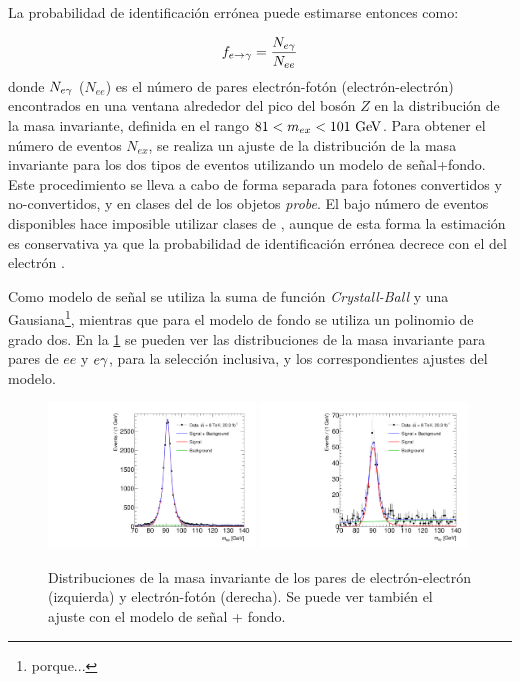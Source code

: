 La probabilidad de identificación errónea {\feg} puede estimarse entonces como:

\begin{equation}\label{eq:efakerate}
  f_{e\rightarrow\gamma} = \frac{N_{e\gamma}}{N_{ee}}
\end{equation}
%
donde $N_{e\gamma}$ ($N_{ee}$) es el número de pares electrón-fotón
(electrón-electrón) encontrados en una ventana alrededor del pico del bosón $Z$ en la distribución de
la masa invariante, definida en el rango $81 < m_{ex} < 101 \gev$. Para obtener
el número de eventos $N_{ex}$, se realiza un ajuste de la distribución de la
masa invariante para los dos tipos de eventos utilizando un modelo de
señal+fondo. Este procedimiento se lleva a cabo de forma separada para fotones
convertidos y no-convertidos, y en clases del {\abseta} de los objetos
\emph{probe}. El bajo número de eventos disponibles hace imposible utilizar
clases de {\pt}, aunque de esta forma la estimación es conservativa ya que la
probabilidad de identificación errónea decrece con el {\pt} del electrón
\cite{Kuhl:1604846}.

Como modelo de señal se utiliza la suma de función \emph{Crystall-Ball} y una
Gausiana\footnote{porque...}, mientras que para el modelo de fondo se utiliza un polinomio de grado
dos. En la \cref{fig:invmass_pairs} se pueden ver las distribuciones de la masa
invariante para pares de $ee$ y $e\gamma$, para la selección inclusiva, y los
correspondientes ajustes del modelo.

\begin{figure}[!htbp]
  \centering

  \includegraphics[width=0.49\textwidth]{figures/Fit_mee_efakes_Data_all}
  \includegraphics[width=0.49\textwidth]{figures/Fit_meg_efakes_Data_all}
  \caption{Distribuciones de la masa invariante de los pares de
    electrón-electrón (izquierda) y electrón-fotón (derecha). Se puede ver también el ajuste
    con el modelo de señal + fondo.}
  \label{fig:invmass_pairs}

\end{figure}

